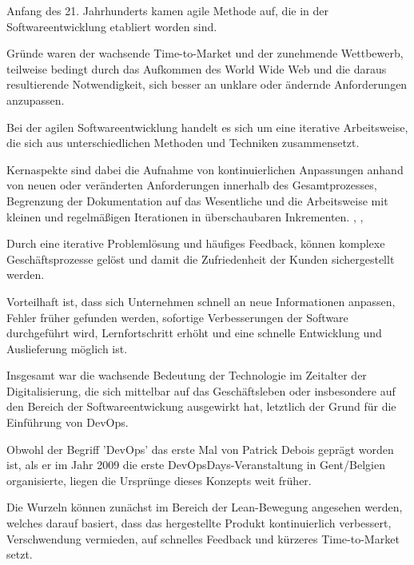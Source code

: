 Anfang des 21. Jahrhunderts kamen agile Methode auf, die in der Softwareentwicklung etabliert worden sind. 

Gründe waren der wachsende Time-to-Market und der zunehmende Wettbewerb, teilweise bedingt durch das Aufkommen des World Wide Web und die daraus resultierende Notwendigkeit, sich besser an unklare oder ändernde Anforderungen anzupassen. \cite{haffke_transformative_2017} 

Bei der agilen Softwareentwicklung handelt es sich um eine iterative Arbeitsweise, die sich aus  unterschiedlichen Methoden und Techniken zusammensetzt.

Kernaspekte sind dabei die Aufnahme von kontinuierlichen Anpassungen anhand von neuen oder veränderten Anforderungen innerhalb des Gesamtprozesses, Begrenzung der Dokumentation auf das Wesentliche und die Arbeitsweise mit kleinen und regelmäßigen Iterationen in überschaubaren Inkrementen. \cite{cohen_introduction_2004}, \cite{bakaji_waterfall_2012}, \cite[S. 18]{ravichandran_devops_2016}

Durch eine iterative Problemlösung und häufiges Feedback, können komplexe Geschäftsprozesse gelöst und damit die Zufriedenheit der Kunden  sichergestellt werden. 

Vorteilhaft ist, dass sich Unternehmen schnell an neue Informationen anpassen, Fehler früher gefunden werden, sofortige Verbesserungen der Software durchgeführt wird, Lernfortschritt erhöht und eine schnelle Entwicklung und Auslieferung möglich ist. \cite[S. 18]{ravichandran_devops_2016}

Insgesamt war die wachsende Bedeutung der Technologie im Zeitalter der Digitalisierung, die sich mittelbar auf das Geschäftsleben oder insbesondere auf den Bereich der Softwareentwickung ausgewirkt hat, letztlich der Grund für die Einführung von DevOps. \cite{haffke_transformative_2017} 

Obwohl der Begriff 'DevOps' das erste Mal von Patrick Debois geprägt worden ist, als er im Jahr 2009 die erste DevOpsDays-Veranstaltung in Gent/Belgien organisierte, liegen die Ursprünge dieses Konzepts weit früher. \cite[S.3]{kim_devops-handbuch_2017}  

Die Wurzeln können zunächst im Bereich der Lean-Bewegung angesehen werden, welches darauf basiert, dass das hergestellte Produkt kontinuierlich verbessert, Verschwendung vermieden, auf schnelles Feedback und kürzeres Time-to-Market setzt. \cite[S.2]{kim_devops-handbuch_2017} \cite{nelson_devops_2016} \cite[S. 11]{ravichandran_devops_2016}

